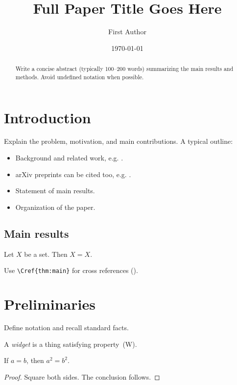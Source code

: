 \documentclass[12pt,reqno]{amsart}
\title[Short Title]{Full Paper Title Goes Here}
\date{\today}
\author{First Author}
\begin{document}
\begin{abstract}
Write a concise abstract (typically 100--200 words) summarizing the main results
and methods. Avoid undefined notation when possible.
\end{abstract}
\maketitle

\section{Introduction}\label{sec:intro}
Explain the problem, motivation, and main contributions. A typical outline:
\begin{itemize}
  \item Background and related work, e.g. \cite{Doe2024Example}.
  \item arXiv preprints can be cited too, e.g. \cite{Smith2025ArxivExample}.
  \item Statement of main results.
  \item Organization of the paper.
\end{itemize}

\subsection{Main results}
\begin{thm}\label{thm:main}
Let \(X\) be a set. Then \(X=X\).
\end{thm}

\begin{rmk}
Use \verb|\Cref{thm:main}| for cross references ().
\end{rmk}

\section{Preliminaries}\label{sec:prelim}
Define notation and recall standard facts.

\begin{defn}
A \emph{widget} is a thing satisfying property~(W).
\end{defn}

\begin{lem}\label{lem:tool}
If \(a=b\), then \(a^2=b^2\).
\end{lem}

\begin{proof}
\step[Idea]
Square both sides.
\step[Finish]
The conclusion follows.
\end{proof}
\end{document}
